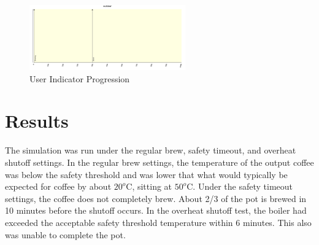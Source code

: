 \documentclass[10pt]{article}
\begin{document}
\begin{center}
  \begin{figure}[H]
    \begin{center}
      \includegraphics[width=0.6\textwidth]{input/test-3-plot}
      \caption{User Indicator Progression}
      \label{ref:test-3-plot}
    \end{center}
  \end{figure}
\end{center}


\section{Results}
The simulation was run under the regular brew, safety timeout, and overheat shutoff settings. In
the regular brew settings, the temperature of the output coffee was below the safety threshold and was
lower that what would typically be expected for coffee by about $20^o$C, sitting at $50^o$C. Under the safety
timeout settings, the coffee does not completely brew. About 2/3 of the pot is brewed in 10
minutes before the shutoff occurs. In the overheat shutoff test, the boiler had exceeded the
acceptable safety threshold temperature within 6 minutes. This also was unable to complete the
pot.
\end{document}

